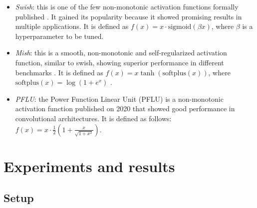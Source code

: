 \begin{itemize}
	\item \textit{Swish}: this is one of the few non-monotonic activation functions formally published \cite{ramachandran2018}. It gained its popularity because it showed promising results in multiple applications. It is defined as $f(x) = x \cdot \text{sigmoid}(\beta x)$, where $\beta$ is a hyperparameter to be tuned.
	\item \textit{Mish}: this is a smooth, non-monotonic and self-regularized activation function, similar to swish, showing superior performance in different benchmarks \cite{misra2019mish}. It is defined as $f(x) = x \tanh (\text{softplus} (x))$, where $\text{softplus} (x) = \log(1+e^x)$ \cite{dugas2001}.
	\item \textit{PFLU}: the Power Function Linear Unit (PFLU) is a non-monotonic activation function published on 2020 that showed good performance in convolutional architectures. It is defined as follows: $f(x) = x \cdot \frac{1}{2} \left( 1 + \frac{x}{\sqrt{1+x^2}} \right)$.

\end{itemize}

\section{Experiments and results} \label{sec:modulus_experiments}
\subsection{Setup}

